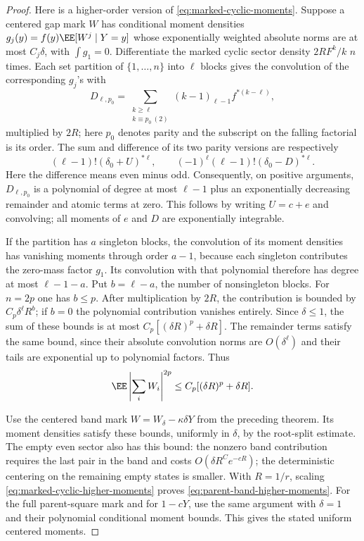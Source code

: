 \documentclass[11pt,letterpaper]{article}
\begin{document}
\begin{proof}
Here is a higher-order version of
\eqref{eq:marked-cyclic-moments}. Suppose a centered gap mark
$W$ has conditional moment densities
$g_j(y)=f(y)\EE[W^j\mid Y=y]$ whose exponentially weighted
absolute norms are at most $C_j\delta$, with $\int g_1=0$.
Differentiate the marked cyclic sector density $2R F^k/k$
$n$ times. Each set partition of $\{1,\ldots,n\}$ into
$\ell$ blocks gives the convolution of the corresponding
$g_j$'s with
\[
 D_{\ell,p_0}
   =\sum_{\substack{k\ge\ell\\k\equiv p_0\ (2)}}
          (k-1)_{\ell-1}f^{*(k-\ell)},
\]
multiplied by $2R$; here $p_0$ denotes parity and the subscript
on the falling factorial is its order. The sum and difference
of its two parity versions are respectively
\[
 (\ell-1)!(\delta_0+U)^{*\ell},\qquad
 (-1)^\ell(\ell-1)!(\delta_0-D)^{*\ell}.
\]
Here the difference means even minus odd. Consequently, on positive arguments,
$D_{\ell,p_0}$ is a polynomial of degree at most $\ell-1$
plus an exponentially decreasing remainder and atomic terms
at zero. This follows by writing $U=c+e$ and convolving; all
moments of $e$ and $D$ are exponentially integrable.

If the partition has $a$ singleton blocks, the convolution
of its moment densities has vanishing moments through order
$a-1$, because each singleton contributes the zero-mass
factor $g_1$. Its convolution with that polynomial therefore
has degree at most $\ell-1-a$. Put $b=\ell-a$, the number of
nonsingleton blocks. For $n=2p$ one has $b\le p$.
After multiplication by $2R$, the contribution is bounded by
$C_p\delta^\ell R^b$; if $b=0$ the polynomial contribution
vanishes entirely. Since $\delta\le1$, the sum of these bounds
is at most
$C_p[(\delta R)^p+\delta R]$.
The remainder terms satisfy the same bound, since their
absolute convolution norms are $O(\delta^\ell)$ and their
tails are exponential up to polynomial factors.
Thus
\begin{equation}\label{eq:marked-cyclic-higher-moments}
 \EE\left|\sum_iW_i\right|^{2p}
                  \le C_p[(\delta R)^p+\delta R].
\end{equation}

Use the centered band mark
$W=W_\delta-\kappa\delta Y$ from the preceding theorem.
Its moment densities satisfy these bounds, uniformly in
$\delta$, by the root-split estimate. The empty even sector
also has this bound: the nonzero band contribution requires
the last pair in the band and costs $O(\delta R^C e^{-cR})$;
the deterministic centering on the remaining empty states is
smaller. With $R=1/r$, scaling
\eqref{eq:marked-cyclic-higher-moments} proves
\eqref{eq:parent-band-higher-moments}.
For the full parent-square mark and for $1-cY$, use the same
argument with $\delta=1$ and their polynomial conditional
moment bounds. This gives the stated uniform centered moments.
\end{proof}
\end{document}
